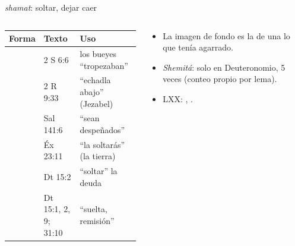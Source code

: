 \begin{frame}{ \emph{shamat}: soltar, dejar caer}
\begin{columns}[t,onlytextwidth]
\begin{column}{0.56\textwidth}
\scriptsize\renewcommand{\arraystretch}{1.12}
\begin{tabular}{@{}L{2.0cm}L{1.4cm}L{3.2cm}@{}}
\toprule
\textbf{Forma} & \textbf{Texto} & \textbf{Uso} \\ \midrule
{} & 2 S 6:6 & los bueyes ``tropezaban'' \\
 & 2 R 9:33 & ``echadla abajo'' (Jezabel) \\
 & Sal 141:6 & ``sean despeñados'' \\
 & Éx 23:11 & ``la soltarás'' (la tierra) \\
 & Dt 15:2 & ``soltar'' la deuda \\
 & Dt 15:1, 2, 9; 31:10 & ``suelta, remisión'' \\
\bottomrule
\end{tabular}
\end{column}
\begin{column}{0.42\textwidth}\small
\begin{itemize}
\item La imagen de fondo es la de una  lo que tenía agarrado.
\item \emph{Shemitá}: solo en Deuteronomio, 5 veces (conteo propio por lema).
\item LXX: , .
\end{itemize}
\end{column}
\end{columns}
\end{frame}

